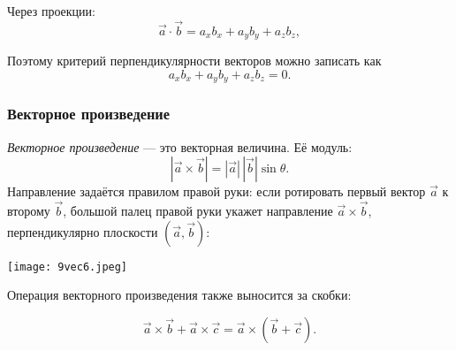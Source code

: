 \documentclass[12pt, a4paper]{article}%
\begin{document}
Через проекции:
\[
\vec a \cdot \vec b = a_x b_x + a_y b_y + a_zb_z,
\]

Поэтому критерий перпендикулярности векторов можно записать как 
\[
a_x b_x + a_y b_y + a_zb_z = 0.
\]


\subsubsection*{Векторное произведение }
\textit{Векторное произведение} — это векторная величина. Её модуль:
\[
|\vec a\times\vec b| = |\vec a|\,|\vec b|\sin\theta.
\]
Направление задаётся правилом правой руки: если ротировать первый вектор $\vec a$ к второму $\vec b$, большой палец правой руки укажет направление $\vec a\times\vec b$, перпендикулярно плоскости $(\vec a,\vec b)$:

\begin{center}
\texttt{[image: 9vec6.jpeg]}
\label{fig:mpr}
\end{center}

 Операция векторного произведения также выносится за скобки:

\[
\vec a \times \vec b + \vec a \times \vec c = \vec a \times(\vec b+\vec c).
\]
\end{document}
